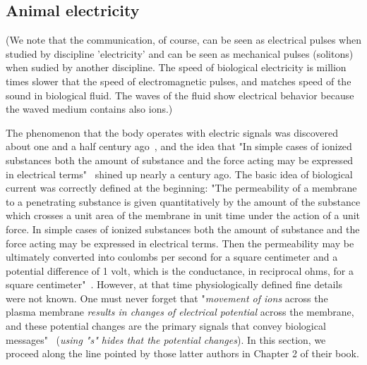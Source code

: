 \subsection[Animal electricity]{Animal electricity\label{sec:PHYSICS_ANIMALELECTRICITY}}


(We note that the communication, of course, can be seen as electrical pulses
when studied by discipline 'electricity' and can be seen as
mechanical pulses (solitons) when sudied by another discipline.
The speed of biological electricity is million times slower
that the speed of electromagnetic pulses, and matches speed of
the sound in biological fluid. 
The waves of the fluid show electrical behavior because 
the waved medium contains also ions.)

The phenomenon that the body operates with electric signals was discovered about one and a half century ago~\cite{HelmoltzHistory:1851},
and the idea that "In simple cases of ionized substances both the amount of
substance and the force acting may be expressed in electrical terms"~\cite{COLE_CURTIS_IMPEDANCE:1939} shined up nearly a century ago. 
The basic idea of \hypertarget{BiologicalCurrent}{biological current} was correctly defined at the beginning:
"The permeability of a membrane to a penetrating substance is
given quantitatively by the amount of the substance which crosses
a unit area of the membrane in unit time under the action of a unit
force. In simple cases of ionized substances both the amount of
substance and the force acting may be expressed in electrical terms.
Then the permeability may be ultimately converted into coulombs
per second for a square centimeter and a potential difference of 1
volt, which is the conductance, in reciprocal ohms, for a square
centimeter"~\cite{COLE_CURTIS_IMPEDANCE:1939}.
However, at that time physiologically defined fine details were not known.
One must never forget that "\textit{movement of
ions} across the plasma membrane \textit{results in changes of electrical potential}
across the membrane, and these potential changes are the primary signals
that convey biological messages"~\cite{JohnstonWuNeurophysiology:1995}
(\textit{using "s" hides that the potential changes}).
In this section, we proceed along the line pointed by those latter authors in Chapter 2 of their book. 

